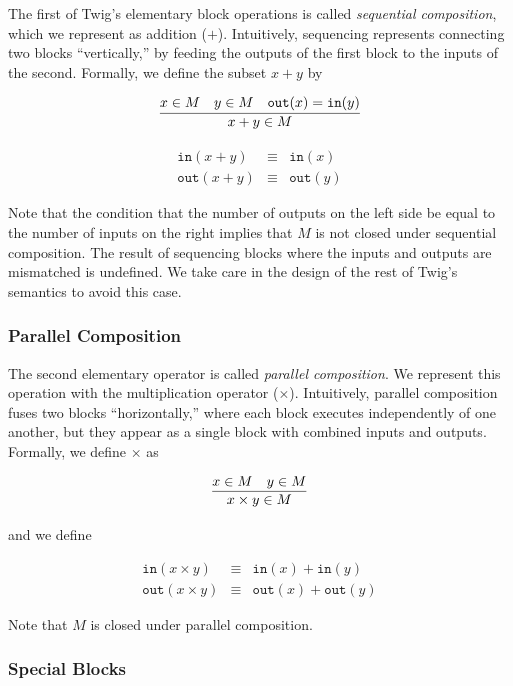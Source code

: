 The first of Twig's elementary block operations is called  \emph{sequential composition}, which we represent as addition ($+$). Intuitively, sequencing represents connecting two blocks  ``vertically,'' by feeding the outputs of the first block to the inputs of the second. Formally, we define the subset $x+y$ by

\[
\infer
  {x+y \in M}
  {x \in M \quad y \in M \quad \mathtt{out}(x) = \mathtt{in}(y)}
\]

\begin{eqnarray*}
\mathtt{in} (x+y) &\equiv& \mathtt{in}(x)\\
\mathtt{out}(x+y) &\equiv& \mathtt{out}(y)
\end{eqnarray*}

Note that the condition that the number of outputs on the left side be equal to the number of inputs on the right implies that $M$ is not closed under sequential composition. The result of sequencing blocks where the inputs and outputs are mismatched is undefined. We take care in the design of the rest of Twig's semantics to avoid this case.

\subsubsection{Parallel Composition}

The second elementary operator is called \emph{parallel composition}. We represent this operation with the multiplication operator ($\times$). Intuitively, parallel composition fuses two blocks ``horizontally,'' where each block executes independently of one another, but they appear as a single block with combined inputs and outputs. Formally, we define $\times$ as

\[
\infer
  {x \times y \in M}
  {x \in M \quad y \in M}
\]

and we define

\begin{eqnarray*}
\mathtt{in} (x \times y) &\equiv& \mathtt{in}(x)  + \mathtt{in}(y)\\ 
\mathtt{out}(x \times y) &\equiv& \mathtt{out}(x) + \mathtt{out}(y) \end{eqnarray*}

Note that $M$ is closed under parallel composition.

\subsubsection{Special Blocks}

